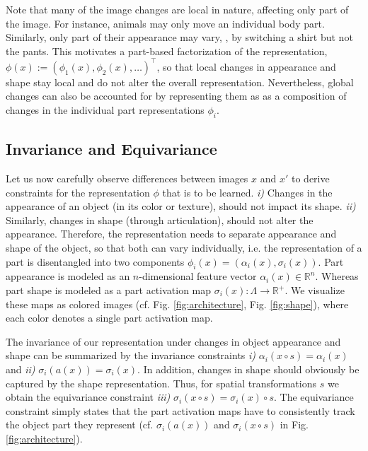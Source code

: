     Note that many of the image changes are local in nature, affecting only part of the image. For instance, animals may only move an individual body part. Similarly, only part of their appearance may vary, \eg, by switching a shirt but not the pants.
    This motivates a part-based factorization of the representation, $\phi(x):=( \phi_1(x), \phi_2(x), \dots )^\top$, so that local changes in appearance and shape stay local and do not alter the overall representation. Nevertheless, global changes can also be accounted for by representing them as as a composition of changes in the individual part representations $\phi_i$.

\subsection{Invariance and Equivariance}
    Let us now carefully observe differences between images $x$ and $x'$ to derive constraints for the representation $\phi$ that is to be learned.
    \emph{i)} Changes in the appearance of an object (\eg in its color or texture), should not impact its shape.
    \emph{ii)} Similarly, changes in shape (\eg through articulation), should not alter the appearance.
    Therefore, the representation needs to separate appearance and shape of the object, so that both can vary individually, i.e. the representation of a part is disentangled into two components $\phi_i(x)=(\alpha_i(x), \sigma_i(x))$.
    Part appearance is modeled as an $n$-dimensional feature vector $\alpha_i(x) \in \mathbb{R}^{n}$.
    Whereas part shape is modeled as a part activation map $\sigma_i(x): \Lambda \rightarrow \mathbb{R}^+$.
    We visualize these maps as colored images (cf. Fig. \ref{fig:architecture}, Fig. \ref{fig:shape}), where each color denotes a single part activation map.

    The invariance of our representation under changes in object appearance and shape can be summarized by the invariance constraints \emph{i)}
    $\alpha_i(x {{\circ}}s) = \alpha_i(x)$ and
    \emph{ii)} $\sigma_i(a(x)) = \sigma_i(x)$.
    In addition, changes in shape should obviously be captured by the shape representation. Thus, for spatial transformations $s$ we obtain the equivariance constraint \emph{iii)}
    $\sigma_i(x {{\circ}}s) = \sigma_i(x) {{\circ}}s$.
    The equivariance constraint simply states that the part activation maps have to consistently track the object part they represent (cf. $\sigma_i(a(x))$ and $\sigma_i(x {\circ} s)$ in Fig. \ref{fig:architecture}).

